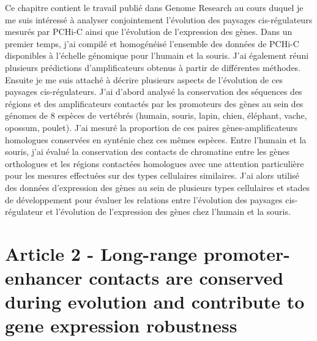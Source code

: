 Ce chapitre contient le travail publié dans Genome Research au cours duquel je me suis intéressé à analyser conjointement l’évolution des paysages \acrshort{cis}-régulateurs mesurés par PCHi-C ainsi que l’évolution de l’expression des gènes. Dans un premier temps, j’ai compilé et homogénéisé l’ensemble des données de PCHi-C disponibles à l’échelle génomique pour l’humain et la souris. J’ai également réuni plusieurs prédictions d’amplificateurs obtenus à partir de différentes méthodes. Ensuite je me suis attaché à décrire plusieurs aspects de l’évolution de ces paysages \acrshort{cis}-régulateurs. J’ai d’abord analysé la conservation des séquences des régions et des amplificateurs contactés par les promoteurs des gènes au sein des génomes de 8 espèces de vertébrés (humain, souris, lapin, chien, éléphant, vache, opossum, poulet). J’ai mesuré la proportion de ces paires gènes-amplificateurs homologues conservées en synténie chez ces mêmes espèces. Entre l’humain et la souris, j’ai évalué la conservation des contacts de chromatine entre les gènes orthologues et les régions contactées homologues avec une attention particulière pour les mesures effectuées sur des types cellulaires similaires. J’ai alors utilisé des données d’expression des gènes au sein de plusieurs types cellulaires et stades de développement pour évaluer les relations entre l’évolution des paysages \acrshort{cis}-régulateur et l’évolution de l’expression des gènes chez l’humain et la souris.

\chapter{Article 2 - Long-range promoter-enhancer contacts are conserved during evolution and contribute to gene expression robustness}
\label{chap:chap3}
